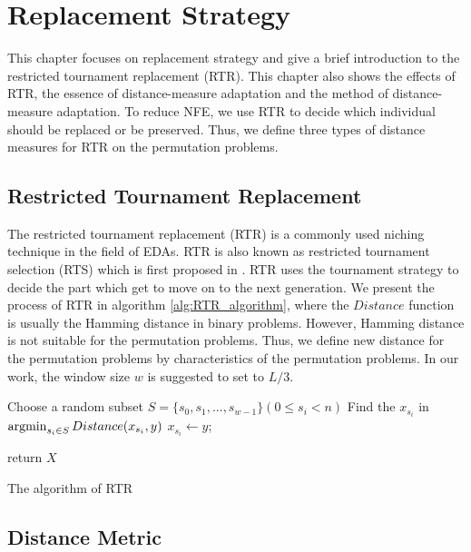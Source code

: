 \section{Replacement Strategy}
\label{ch:replacement_strategy}

This chapter focuses on replacement strategy and give a brief introduction to the restricted tournament replacement (RTR). This chapter also shows the effects of RTR, the essence of distance-measure adaptation and the method of distance-measure adaptation. To reduce NFE, we use RTR to decide which individual should be replaced or be preserved. Thus, we define three types of distance measures for RTR on the permutation problems.




\subsection{Restricted Tournament Replacement}
The restricted tournament replacement (RTR) is a commonly used niching technique in the field of EDAs. RTR is also known as restricted tournament selection (RTS) which is first proposed in \citep{harik1995rts}. RTR uses the tournament strategy to decide the part which get to move on to the next generation. We present the process of RTR in algorithm \ref{alg:RTR_algorithm}, where the $Distance$ function is usually the Hamming distance in binary problems. However, Hamming distance is not suitable for the permutation problems. Thus, we define new distance for the permutation problems by characteristics of the permutation problems. In our work, the window size $w$ is suggested to set to $L/3$.


\begin{algorithm}[htbp]
    {
        Choose a random subset $S =\lbrace s_0, s_1, ..., s_{w-1}\rbrace (0\leq s_i <n)$\;
        Find the $x_{s_i}$ in $\mathop{\argmin}_{{s_i} \in S} Distance(x_{s_i},y)$\;
              {
        $x_{s_i} \leftarrow y$;
        }
        
    }
    return $X$\;
    \caption{The algorithm of RTR}
    \label{alg:RTR_algorithm}
\end{algorithm}


\subsection{Distance Metric}

